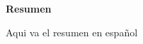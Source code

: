 \newenvironment{resumen}%
    {\null\vfill\begin{center}%
    \bfseries Resumen\end{center}}%
    {\vfill\null}
        \begin{resumen}
        Aqui va el resumen en español
        \end{resumen}